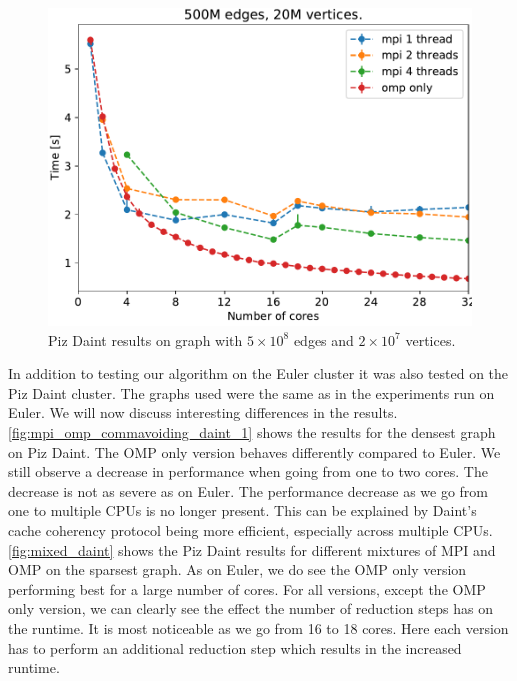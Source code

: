 \begin{figure}
\includegraphics[width=\fsize]{data/all_vertices_without_commavoid_20M.pdf}
\caption{Piz Daint results on graph with $5\times10^8$ edges and $2\times10^7$ vertices.}
\label{fig:mixed_daint}
\end{figure}

In addition to testing our algorithm on the Euler cluster it was also tested on the Piz Daint cluster. The graphs used were the same as in the experiments run on Euler. We will now discuss interesting differences in the results.\\
\autoref{fig:mpi_omp_commavoiding_daint_1} shows the results for the densest graph on Piz Daint. The OMP only version behaves differently compared to Euler. We still observe a decrease in performance when going from one to two cores. The decrease is not as severe as on Euler. The performance decrease as we go from one to multiple CPUs is no longer present. This can be explained by Daint's cache coherency protocol being more efficient, especially across multiple CPUs.
\autoref{fig:mixed_daint} shows the Piz Daint results for different mixtures of MPI and OMP on the sparsest graph. As on Euler, we do see the OMP only version performing best for a large number of cores. For all versions, except the OMP only version, we can clearly see the effect the number of reduction steps has on the runtime. It is most noticeable as we go from 16 to 18 cores. Here each version has to perform an additional reduction step which results in the increased runtime.






